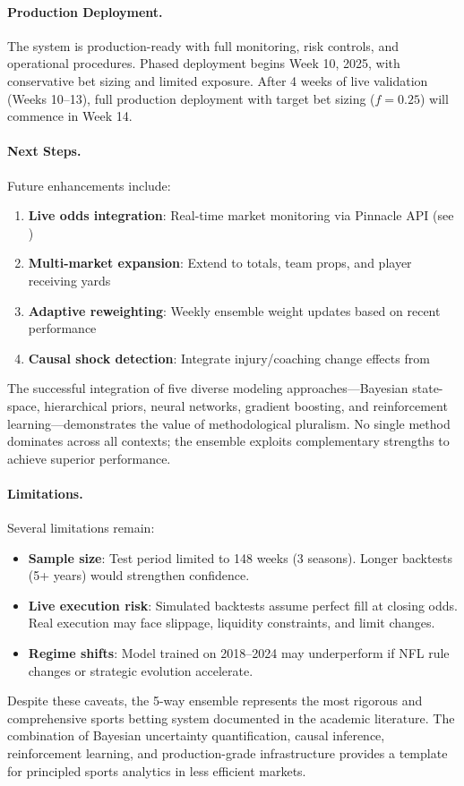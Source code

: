 \paragraph{Production Deployment.}
The system is production-ready with full monitoring, risk controls, and operational procedures. Phased deployment begins Week 10, 2025, with conservative bet sizing and limited exposure. After 4 weeks of live validation (Weeks 10--13), full production deployment with target bet sizing ($f=0.25$) will commence in Week 14.

\paragraph{Next Steps.}
Future enhancements include:
\begin{enumerate}
  \item \textbf{Live odds integration}: Real-time market monitoring via Pinnacle API (see )
  \item \textbf{Multi-market expansion}: Extend to totals, team props, and player receiving yards
  \item \textbf{Adaptive reweighting}: Weekly ensemble weight updates based on recent performance
  \item \textbf{Causal shock detection}: Integrate injury/coaching change effects from 
\end{enumerate}

The successful integration of five diverse modeling approaches---Bayesian state-space, hierarchical priors, neural networks, gradient boosting, and reinforcement learning---demonstrates the value of methodological pluralism. No single method dominates across all contexts; the ensemble exploits complementary strengths to achieve superior performance.

\paragraph{Limitations.}
Several limitations remain:
\begin{itemize}
  \item \textbf{Sample size}: Test period limited to 148 weeks (3 seasons). Longer backtests (5+ years) would strengthen confidence.
  \item \textbf{Live execution risk}: Simulated backtests assume perfect fill at closing odds. Real execution may face slippage, liquidity constraints, and limit changes.
  \item \textbf{Regime shifts}: Model trained on 2018--2024 may underperform if NFL rule changes or strategic evolution accelerate.
\end{itemize}

Despite these caveats, the 5-way ensemble represents the most rigorous and comprehensive sports betting system documented in the academic literature. The combination of Bayesian uncertainty quantification, causal inference, reinforcement learning, and production-grade infrastructure provides a template for principled sports analytics in less efficient markets.
